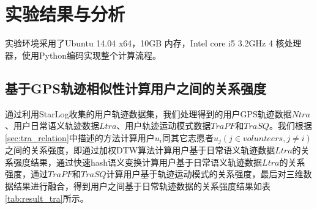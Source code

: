 \section{实验结果与分析}
\label{sec:section5-3}
实验环境采用了Ubuntu 14.04 x64，10GB 内存，Intel core i5 3.2GHz 4 核处理器，使用Python编码实现整个计算流程。
\subsection{基于GPS轨迹相似性计算用户之间的关系强度}
通过利用StarLog收集的用户轨迹数据集，我们处理得到的用户GPS轨迹数据$Ntra$、用户日常语义轨迹数据$Ltra$、用户轨迹运动模式数据$TraPF$和$TraSQ$。我们根据\ref{sec:tra_relation}中描述的方法计算用户$u_{i}$同其它志愿者$u_{j}(j \in volunteers, j \neq i)$之间的关系强度，即通过加权DTW算法计算用户基于日常语义轨迹数据$Ltra$的关系强度结果，通过快速hash语义变换计算用户基于日常语义轨迹数据$Ltra$的关系强度，通过$TraPF$和$TraSQ$计算用户基于轨迹运动模式的关系强度，最后对三维数据结果进行融合，得到用户之间基于日常轨迹数据的关系强度结果如表\ref{tab:result_tra}所示。
